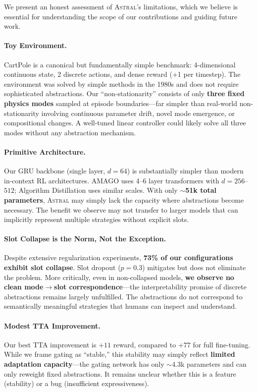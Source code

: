\documentclass{article}
\newcommand{\astral}{\textsc{Astral}}
\newcommand{\method}{\astral}
\begin{document}
We present an honest assessment of \method{}'s limitations, which we believe is essential for understanding the scope of our contributions and guiding future work.

\paragraph{Toy Environment.} CartPole \citep{barto1983neuronlike} is a canonical but fundamentally simple benchmark: 4-dimensional continuous state, 2 discrete actions, and dense reward (+1 per timestep). The environment was solved by simple methods in the 1980s \citep{barto1983neuronlike} and does not require sophisticated abstractions. Our ``non-stationarity'' consists of only \textbf{three fixed physics modes} sampled at episode boundaries---far simpler than real-world non-stationarity involving continuous parameter drift, novel mode emergence, or compositional changes. A well-tuned linear controller could likely solve all three modes without any abstraction mechanism.

\paragraph{Primitive Architecture.} Our GRU backbone (single layer, $d=64$) is substantially simpler than modern in-context RL architectures. AMAGO \citep{grigsby2024amago} uses 4--6 layer transformers with $d=256$--$512$; Algorithm Distillation \citep{laskin2022context} uses similar scales. With only \textbf{$\sim$51k total parameters}, \method{} may simply lack the capacity where abstractions become necessary. The benefit we observe may not transfer to larger models that can implicitly represent multiple strategies without explicit slots.

\paragraph{Slot Collapse is the Norm, Not the Exception.} Despite extensive regularization experiments, \textbf{73\% of our configurations exhibit slot collapse}. Slot dropout ($p=0.3$) mitigates but does not eliminate the problem. More critically, even in non-collapsed models, \textbf{we observe no clean mode$\to$slot correspondence}---the interpretability promise of discrete abstractions remains largely unfulfilled. The abstractions do not correspond to semantically meaningful strategies that humans can inspect and understand.

\paragraph{Modest TTA Improvement.} Our best TTA improvement is $+11$ reward, compared to $+77$ for full fine-tuning. While we frame gating as ``stable,'' this stability may simply reflect \textbf{limited adaptation capacity}---the gating network has only $\sim$4.3k parameters and can only reweight fixed abstractions. It remains unclear whether this is a feature (stability) or a bug (insufficient expressiveness).
\end{document}
